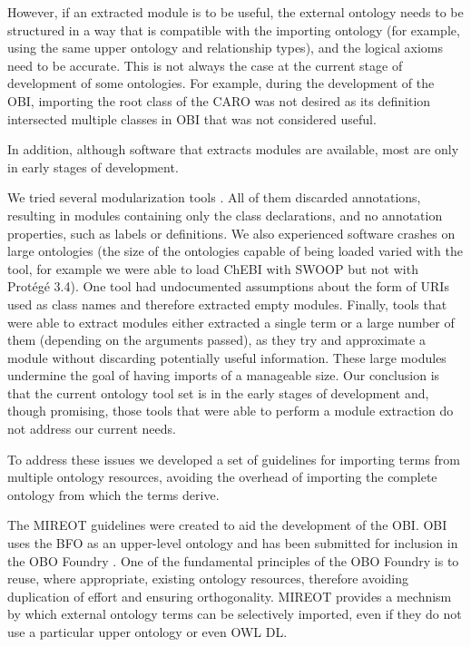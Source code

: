 \documentclass{ao2e}%
\begin{document}
However, if an extracted module is to be useful, the external ontology needs to be structured in a way that is compatible with the importing ontology (for example, using the same upper ontology and relationship types), and the logical axioms need to be accurate. 
This is not always the case at the current stage of development of some ontologies.
For example, during the development of the \ac{OBI}\cite{OBI}, importing the root class of the \ac{CARO}\cite{CARO} was not desired as its definition intersected multiple classes in \ac{OBI} that was not considered useful. %

In addition, although software that extracts modules are available, most are only in early stages of development.

We tried several modularization tools \cite{Grau2} \cite{Jimenez}  \cite{Seidenberg} \cite{Sirin}. 
All of them discarded annotations, resulting in modules containing only the class declarations, and no annotation properties, such as labels or definitions.
We also experienced software crashes on large ontologies (the size of the ontologies capable of being loaded varied with the tool, for example we were able to load ChEBI \cite{ChEBI} with SWOOP but not with Prot\'eg\'e 3.4).
One tool %
had undocumented assumptions about the form of URIs used as class names and therefore extracted empty modules. 
Finally, tools %
that were able to extract modules either extracted a single term or a large number of them (depending on the arguments passed), as they try and approximate a module without discarding potentially useful information. These large modules undermine the goal of having imports of a manageable size.
Our conclusion is that the current ontology tool set is in the early stages of development and, though promising, those tools that were able to perform a module extraction do not address our current needs.

To address these issues we developed a set of guidelines for importing terms from multiple ontology resources, avoiding the overhead of importing the complete ontology from which the terms derive. 

The \ac{MIREOT} guidelines were created to aid the development of the \ac{OBI}.
\ac{OBI} uses the \ac{BFO} \cite{BFO} as an upper-level ontology and has been submitted for inclusion in the \ac{OBO} Foundry \cite{OBOFoundry}. 
One of the fundamental principles of the \ac{OBO} Foundry is to reuse, where appropriate, existing ontology resources, therefore avoiding duplication of effort and ensuring orthogonality.
\ac{MIREOT} provides a mechnism by which external ontology terms can be selectively imported, even if they do not use a particular upper ontology or even OWL DL.
\end{document}
